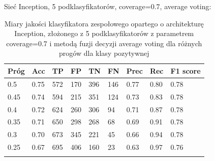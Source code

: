 \documentclass[polish,12pt]{aghthesis}
\begin{document}
\par\noindent Sieć Inception, 5 podklasyfikatorów, coverage=0.7, average voting:
\renewcommand{\arraystretch}{1.57}
 \begin{longtable}[h!]{|m{2.0cm}|m{1.2cm}|m{1.2cm}|m{1.2cm}|m{1.2cm}|m{1.2cm}|m{1.2cm}|m{1.2cm}|m{1.6cm}|}
 \hline
 Próg & Acc & TP & FP & TN & FN & Prec & Rec & F1 score\\
 \hline
 0.5 & 0.75 & 572 & 170 & 396 & 146 & 0.77 & 0.80 & 0.78\\
 \hline
 0.45 & 0.74 & 594 & 215 & 351 & 124 & 0.73 & 0.83 & 0.78\\
 \hline
 0.4 & 0.72 & 624 & 260 & 306 & 94 & 0.71 & 0.87 & 0.78\\
 \hline
 0.35 & 0.71 & 650 & 298 & 268 & 68 & 0.69 & 0.91 & 0.78\\
 \hline
 0.3 & 0.70 & 673 & 345 & 221 & 45 & 0.66 & 0.94 & 0.78\\
 \hline
 0.25 & 0.67 & 695 & 406 & 160 & 23 & 0.63 & 0.97 & 0.76\\
 \hline
\caption{Miary jakości klasyfikatora zespołowego opartego o architekturę Inception, złożonego z 5 podklasyfikatorów z parametrem coverage=0.7 i metodą fuzji decyzji average voting dla różnych progów dla klasy pozytywnej}
\label{table:36}
\end{longtable}
\end{document}
